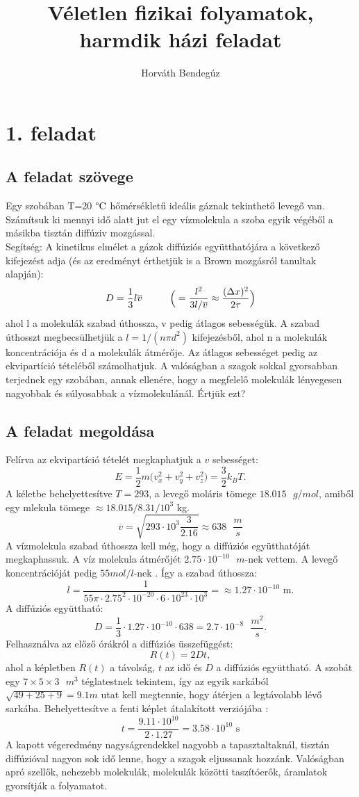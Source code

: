 \documentclass[12pt]{article}
\title{Véletlen fizikai folyamatok, harmdik házi feladat}
\author{Horváth Bendegúz}
\begin{document}
\maketitle
\section*{1. feladat}
\subsection*{A feladat szövege}
Egy szobában T=20$\text{ \textdegree{C}}$ hőmérsékletű ideális gáznak tekinthető levegő van. Számítsuk
ki mennyi idő alatt jut el egy vízmolekula a szoba egyik végéből a másikba tisztán diffúziv mozgással.\\
Segítség:
A kinetikus elmélet a gázok diffúziós együtthatójára a következő kifejezést adja (és az eredményt érthetjük is a Brown mozgásról tanultak alapján):
$$ D = \frac{1}{3}l\overline{v}\hspace{1 cm}\Big (= \frac{l^2}{3l/\overline{v}}\approx\frac{(\Delta x)^2}{2\tau}\Big )$$
     ahol l a molekulák szabad úthossza, v pedig átlagos sebességük. A szabad úthosszt megbecsülhetjük a $l = 1/(n\pi d^2)$ kifejezésből, ahol n a molekulák koncentrációja és d a molekulák átmérője. Az átlagos sebességet pedig az ekvipartíció tételéből számolhatjuk.
A valóságban a szagok sokkal gyorsabban terjednek egy szobában, annak ellenére, hogy a megfelelő molekulák lényegesen nagyobbak és súlyosabbak a vízmolekulánál. Értjük ezt?


\subsection*{A feladat megoldása}
Felírva az ekvipartíció tételét megkaphatjuk a $v$ sebességet:
$$E = \frac{1}{2}m\big (v^2_x+v^2_y+v^2_z \big ) = \frac{3}{2}k_B T.$$
A kéletbe behelyettesítve $T = 293$, a levegő moláris tömege $18.015 \text{ }g/mol$, amiből egy mlekula tömege $\approx 18.015/8.31/10^3$ kg.
 $$\overline{v} = \sqrt{293\cdot 10^3 \frac{3}{2.16 }} \approx 638 \text{  }\frac{m}{s} $$
A vízmolekula szabad úthossza kell még, hogy a diffúziós együtthatóját megkaphassuk. A víz molekula átmérőjét $2.75\cdot10^{-10}\text{ }m$-nek vettem\cite{diam}. A levegő koncentrációját pedig $55 mol/l$-nek \cite{conc}.
Így a szabad úthossza:
$$l = \frac{1}{55 \pi\cdot 2.75^2\cdot 10^{-20}\cdot 6\cdot 10^{23}\cdot 10^3} = \approx 1.27 \cdot 10^{-10} \text{ m.}$$
A diffúziós együttható:
$$D = \frac{1}{3}\cdot 1.27\cdot 10^{-10}\cdot 638 = 2.7\cdot 10^{-8} \text{  }\frac{m^2}{s} .$$
Felhasználva az előző órákról a diffúziós üsszefüggést:
$$R(t) = 2Dt,$$
ahol a képletben $R(t)$ a távolság, $t$ az idő és $D$ a diffúziós együttható. A szobát egy $7 \times 5\times 3 \text{  }m^3$ téglatestnek tekintem, így az egyik sarkából $\sqrt{49+25+9} = 9.1 m$ utat kell megtennie, hogy átérjen a legtávolabb lévő sarkába. Behelyettesítve a fenti képlet átalakított verziójába :
$$t =  \frac{9.11\cdot 10^{10}}{2\cdot 1.27} = 3.58\cdot 10^{10}\text{ s}$$
A kapott végeredmény nagyságrendekkel nagyobb a tapasztaltaknál, tisztán diffúzióval nagyon sok idő lenne, hogy a szagok eljussanak hozzánk. Valóságban apró szellők, nehezebb molekulák, molekulák közötti taszítóerők, áramlatok gyorsítják a folyamatot. 
\newpage
\end{document}
